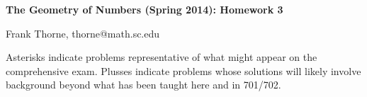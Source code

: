 \documentclass[12pt]{article}
\begin{document}
\setlength{\topmargin}{-2mm}





\begin{center}{\bf The Geometry of Numbers (Spring 2014): Homework 3}
\end{center}
\begin{center}Frank Thorne, thorne@math.sc.edu
\end{center}

Asterisks indicate problems representative of what might appear on the comprehensive exam.
Plusses indicate problems whose solutions will likely involve background beyond what has been taught here
and in 701/702.
\\
\\
\end{document}
